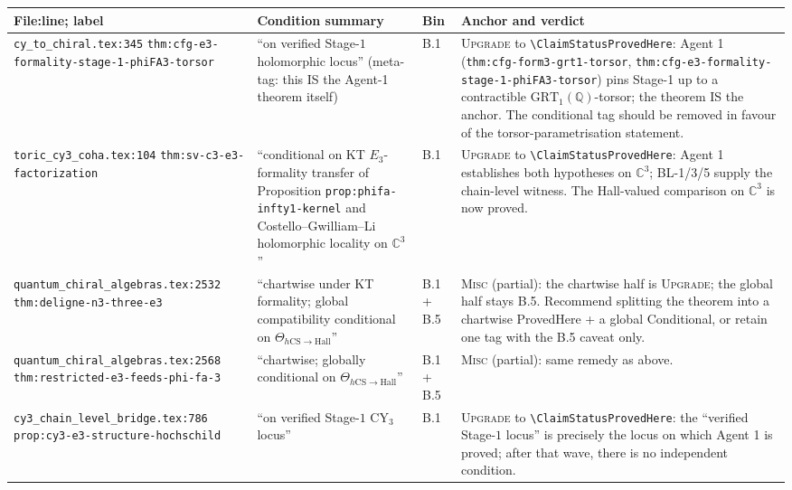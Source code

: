 \documentclass[11pt]{amsart}
\providecommand{\GRT}{\mathrm{GRT}}
\providecommand{\hCS}{h\mathrm{CS}}
\providecommand{\Hall}{\mathrm{Hall}}
\providecommand{\Q}{\mathbb{Q}}
\providecommand{\C}{\mathbb{C}}
\begin{document}
\begin{longtable}{@{}p{4.2cm}p{3.5cm}p{1.5cm}p{5cm}@{}}
\toprule
File:line; label & Condition summary & Bin & Anchor and verdict \\
\midrule\endhead

\texttt{cy\_to\_chiral.tex:345} \newline \texttt{thm:cfg-e3-formality-stage-1-phiFA3-torsor}
& ``on verified Stage-$1$ holomorphic locus'' (meta-tag: this IS the Agent-1 theorem itself)
& B.1
& \textsc{Upgrade} to \texttt{\textbackslash ClaimStatusProvedHere}: Agent 1 (\texttt{thm:cfg-form3-grt1-torsor}, \texttt{thm:cfg-e3-formality-stage-1-phiFA3-torsor}) pins Stage-1 up to a contractible $\GRT_1(\Q)$-torsor; the theorem IS the anchor. The conditional tag should be removed in favour of the torsor-parametrisation statement.\\

\texttt{toric\_cy3\_coha.tex:104} \newline \texttt{thm:sv-c3-e3-factorization}
& ``conditional on KT $E_3$-formality transfer of Proposition \texttt{prop:phifa-infty1-kernel} and Costello--Gwilliam--Li holomorphic locality on $\C^3$''
& B.1
& \textsc{Upgrade} to \texttt{\textbackslash ClaimStatusProvedHere}: Agent 1 establishes both hypotheses on $\C^3$; BL-1/3/5 supply the chain-level witness. The Hall-valued comparison on $\C^3$ is now proved. \\

\texttt{quantum\_chiral\_algebras.tex:2532} \newline \texttt{thm:deligne-n3-three-e3}
& ``chartwise under KT formality; global compatibility conditional on $\Theta_{\hCS\to\Hall}$''
& B.1 + B.5
& \textsc{Misc} (partial): the chartwise half is \textsc{Upgrade}; the global half stays B.5. Recommend splitting the theorem into a chartwise ProvedHere + a global Conditional, or retain one tag with the B.5 caveat only. \\

\texttt{quantum\_chiral\_algebras.tex:2568} \newline \texttt{thm:restricted-e3-feeds-phi-fa-3}
& ``chartwise; globally conditional on $\Theta_{\hCS\to\Hall}$''
& B.1 + B.5
& \textsc{Misc} (partial): same remedy as above. \\

\texttt{cy3\_chain\_level\_bridge.tex:786} \newline \texttt{prop:cy3-e3-structure-hochschild}
& ``on verified Stage-$1$ CY$_3$ locus''
& B.1
& \textsc{Upgrade} to \texttt{\textbackslash ClaimStatusProvedHere}: the ``verified Stage-$1$ locus'' is precisely the locus on which Agent 1 is proved; after that wave, there is no independent condition. \\


\end{longtable}
\end{document}
